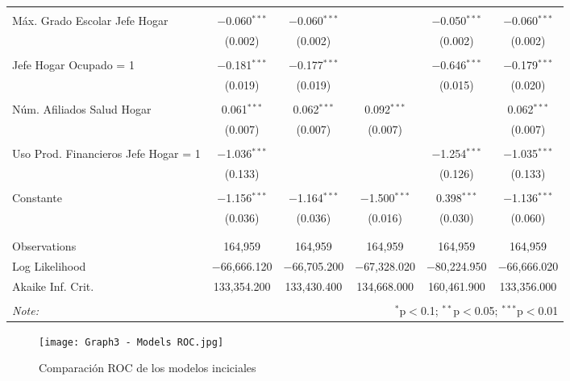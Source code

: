 \documentclass[11pt]{article}
\begin{document}
\begin{table}[!htbp]
{\begin{tabular}{@{\extracolsep{5pt}}lccccc}
  & & & & & \\ 
 Máx. Grado Escolar Jefe Hogar & $-$0.060$^{***}$ & $-$0.060$^{***}$ &  & $-$0.050$^{***}$ & $-$0.060$^{***}$ \\ 
  & (0.002) & (0.002) &  & (0.002) & (0.002) \\ 
  & & & & & \\ 
 Jefe Hogar Ocupado = 1 & $-$0.181$^{***}$ & $-$0.177$^{***}$ &  & $-$0.646$^{***}$ & $-$0.179$^{***}$ \\ 
  & (0.019) & (0.019) &  & (0.015) & (0.020) \\ 
  & & & & & \\ 
 Núm. Afiliados Salud Hogar & 0.061$^{***}$ & 0.062$^{***}$ & 0.092$^{***}$ &  & 0.062$^{***}$ \\ 
  & (0.007) & (0.007) & (0.007) &  & (0.007) \\ 
  & & & & & \\ 
 Uso Prod. Financieros Jefe Hogar = 1& $-$1.036$^{***}$ &  &  & $-$1.254$^{***}$ & $-$1.035$^{***}$ \\ 
  & (0.133) &  &  & (0.126) & (0.133) \\ 
  & & & & & \\ 
 Constante & $-$1.156$^{***}$ & $-$1.164$^{***}$ & $-$1.500$^{***}$ & 0.398$^{***}$ & $-$1.136$^{***}$ \\ 
  & (0.036) & (0.036) & (0.016) & (0.030) & (0.060) \\ 
  & & & & & \\ 
\hline \\[-1.8ex] 
Observations & 164,959 & 164,959 & 164,959 & 164,959 & 164,959 \\ 
Log Likelihood & $-$66,666.120 & $-$66,705.200 & $-$67,328.020 & $-$80,224.950 & $-$66,666.020 \\ 
Akaike Inf. Crit. & 133,354.200 & 133,430.400 & 134,668.000 & 160,461.900 & 133,356.000 \\ 
\hline 
\hline \\[-1.8ex] 
\textit{Note:}  & \multicolumn{5}{r}{$^{*}$p$<$0.1; $^{**}$p$<$0.05; $^{***}$p$<$0.01} \\ 
\end{tabular} }
\end{table}


\begin{figure}[h]
\caption{Comparación ROC de los modelos inciciales }
\centering
\texttt{[image: Graph3 - Models ROC.jpg]}
\end{figure}
\end{document}
